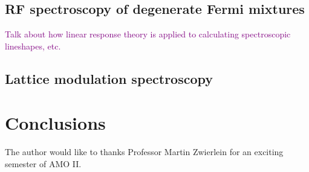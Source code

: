 \documentclass[reprint,
nofootinbib,
amsmath,amssymb,
aps]{revtex4-1}
\begin{document}
\subsection{RF spectroscopy of degenerate Fermi mixtures}


\textcolor{purple}{Talk about how linear response theory is applied to calculating spectroscopic lineshapes, etc.}

\subsection{Lattice modulation spectroscopy}




\section{Conclusions}



\begin{acknowledgments}
	The author would like to thanks Professor Martin Zwierlein for an exciting semester of AMO II. 
\end{acknowledgments}



 
\end{document}
